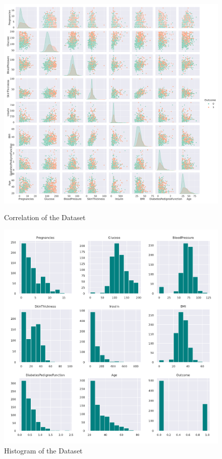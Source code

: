 \documentclass[11pt]{article}
\begin{document}
	\begin{figure}[H]
		\begin{minipage}[b]{0.5\textwidth}
			\centering
			\includegraphics[height=\textwidth]{img/dataset_correlation.pdf}
			\caption{Correlation of the Dataset}
			\label{fig:datasetCorrelation}

		\end{minipage}
		\begin{minipage}[b]{0.5\textwidth}
			\centering
			\includegraphics[height=\textwidth]{img/dataset_histogram.pdf}
			\caption{Histogram of the Dataset}
			\label{fig:datasetHistogram}
		\end{minipage}
	\end{figure}
	
\end{document}
